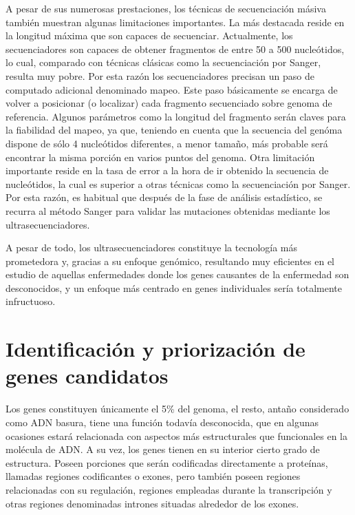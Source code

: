 \medskip
A pesar de sus numerosas prestaciones, los técnicas de secuenciación másiva también muestran algunas limitaciones importantes. La más destacada reside en la longitud máxima que son capaces de secuenciar. Actualmente, los secuenciadores son capaces de obtener fragmentos de entre 50 a 500 nucleótidos, lo cual, comparado con técnicas clásicas como la secuenciación por Sanger, resulta muy pobre. Por esta razón los secuenciadores precisan un paso de computado adicional denominado mapeo. Este paso básicamente se encarga de volver a posicionar (o localizar) cada fragmento secuenciado sobre genoma de referencia. Algunos parámetros como la longitud del fragmento serán claves para la fiabilidad del mapeo, ya que, teniendo en cuenta que la secuencia del genóma dispone de sólo 4 nucleótidos diferentes, a menor tamaño, más probable será encontrar la misma porción en varios puntos del genoma. Otra limitación importante reside en la tasa de error a la hora de ir obtenido la secuencia de nucleótidos, la cual es superior a otras técnicas como la secuenciación por Sanger. Por esta razón, es habitual que después de la fase de análisis estadístico, se recurra al método Sanger para validar las mutaciones obtenidas mediante los ultrasecuenciadores.

\medskip
A pesar de todo, los ultrasecuenciadores constituye la tecnología más prometedora y, gracias a su enfoque genómico, resultando muy eficientes en el estudio de aquellas enfermedades donde los genes causantes de la enfermedad son desconocidos, y un enfoque más centrado en genes individuales sería totalmente infructuoso.


\section{Identificación y priorización de genes candidatos}

\medskip
Los genes constituyen únicamente el 5\% del genoma, el resto, antaño considerado como ADN basura, tiene una función todavía desconocida, que en algunas  ocasiones estará relacionada con aspectos más estructurales que funcionales en la molécula de ADN. A su vez, los genes tienen en su interior cierto grado de estructura. Poseen porciones que serán codificadas directamente a proteínas, llamadas regiones codificantes o exones, pero también poseen regiones relacionadas con su regulación, regiones empleadas durante la transcripción y otras regiones denominadas intrones situadas alrededor de los exones.

